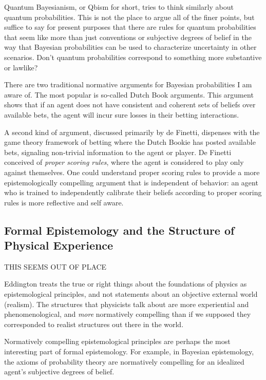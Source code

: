Quantum Bayesianism, or Qbism for short, tries to think similarly about quantum probabilities.  This is not the place to argue all of the finer points, but suffice to say for present purposes that there are rules for quantum probabilities that seem like more than just conventions or subjective degrees of belief in the way that Bayesian probabilities can be used to characterize uncertainty in other scenarios.  Don't quantum probabilities correspond to something more substantive or lawlike?

There are two traditional normative arguments for Bayesian probabilities I am aware of.  The most popular is so-called Dutch Book arguments.  This argument shows that if an agent does not have consistent and coherent sets of beliefs over available bets, the agent will incur sure losses in their betting interactions.

A second kind of argument, discussed primarily by de Finetti, dispenses with the game theory framework of betting where the Dutch Bookie has posted available bets, signaling non-trivial information to the agent or player.  De Finetti conceived of \emph{proper scoring rules}, where the agent is considered to play only against themselves.  One could understand proper scoring rules to provide a more epistemologically compelling argument that is independent of behavior: an agent who is trained to independently calibrate their beliefs according to proper scoring rules is more reflective and self aware.  

\subsection{Formal Epistemology and the Structure of Physical Experience}

THIS SEEMS OUT OF PLACE

Eddington treats the true or right things about the foundations of physics as epistemological principles, and not statements about an objective external world (realism).  The structures that physicists talk about are more experiential and phenomenological, and \emph{more} normatively compelling than if we supposed they corresponded to realist structures out there in the world.  

Normatively compelling epistemological principles are perhaps the most interesting part of formal epistemology.  For example, in Bayesian epistemology, the axioms of probability theory are normatively compelling for an idealized agent's subjective degrees of belief.  


